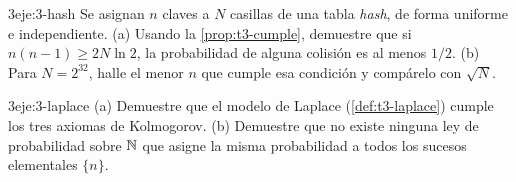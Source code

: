 \begin{ejercicio}{3}{eje:3-hash}
Se asignan $n$ claves a $N$ casillas de una tabla \emph{hash}, de forma uniforme e independiente. (a) Usando la \cref{prop:t3-cumple}, demuestre que si $n(n-1)\ge 2N\ln 2$, la probabilidad de alguna colisión es al menos $1/2$. (b) Para $N=2^{32}$, halle el menor $n$ que cumple esa condición y compárelo con $\sqrt{N}$.
\end{ejercicio}

\begin{ejercicio}{3}{eje:3-laplace}
(a) Demuestre que el modelo de Laplace (\cref{def:t3-laplace}) cumple los tres axiomas de Kolmogorov. (b) Demuestre que no existe ninguna ley de probabilidad sobre $\mathbb{N}$ que asigne la misma probabilidad a todos los sucesos elementales $\{n\}$.
\end{ejercicio}
